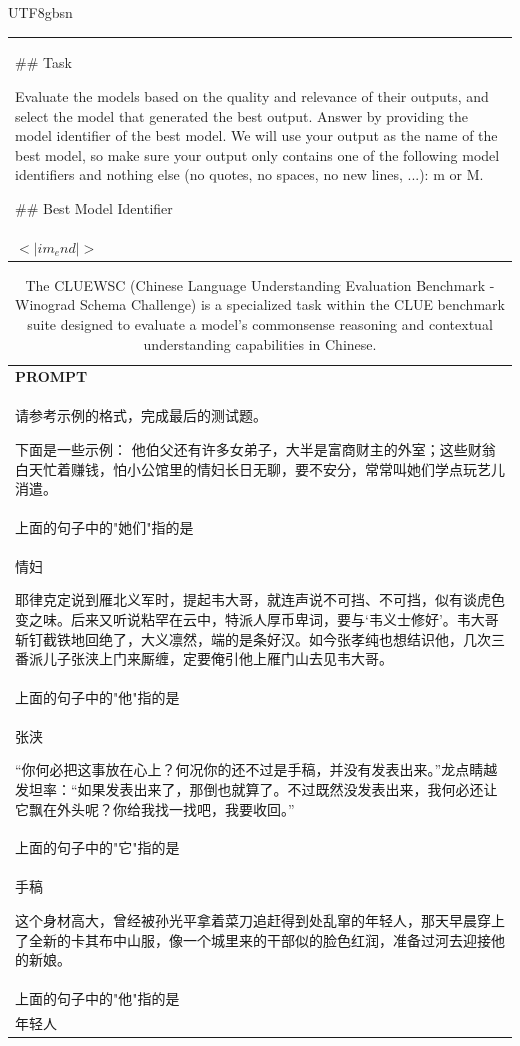 \documentclass[11pt, a4paper, logo, copyright, nonumbering]{deepseek}
\begin{document}
\begin{CJK*}{UTF8}{gbsn}
\begin{table}[h]
\begin{tabular}{p{}}
\#\# Task

Evaluate the models based on the quality and relevance of their outputs, and select the model that generated the best output. Answer by providing the model identifier of the best model. We will use your output as the name of the best model, so make sure your output only contains one of the following model identifiers and nothing else (no quotes, no spaces, no new lines, ...): m or M.

\#\# Best Model Identifier\\
$<|im_end|>$\\ \hline
    \end{tabular}
\end{table}

\begin{table}[h]
    \centering \small
        \caption{The CLUEWSC (Chinese Language Understanding Evaluation Benchmark - Winograd Schema Challenge) is a specialized task within the CLUE benchmark suite designed to evaluate a model's commonsense reasoning and contextual understanding capabilities in Chinese. }
    \label{tab:cluewsc_eval_format_example}
    \begin{tabular}{p{}}
    \hline
    \textbf{PROMPT}\\
    请参考示例的格式，完成最后的测试题。

下面是一些示例：
他伯父还有许多女弟子，大半是富商财主的外室；这些财翁白天忙着赚钱，怕小公馆里的情妇长日无聊，要不安分，常常叫她们学点玩艺儿消遣。\\
上面的句子中的"她们"指的是\\
情妇

耶律克定说到雁北义军时，提起韦大哥，就连声说不可挡、不可挡，似有谈虎色变之味。后来又听说粘罕在云中，特派人厚币卑词，要与‘韦义士修好’。韦大哥斩钉截铁地回绝了，大义凛然，端的是条好汉。如今张孝纯也想结识他，几次三番派儿子张浃上门来厮缠，定要俺引他上雁门山去见韦大哥。\\
上面的句子中的"他"指的是\\
张浃

“你何必把这事放在心上？何况你的还不过是手稿，并没有发表出来。”龙点睛越发坦率：“如果发表出来了，那倒也就算了。不过既然没发表出来，我何必还让它飘在外头呢？你给我找一找吧，我要收回。”\\
上面的句子中的"它"指的是 \\
手稿

这个身材高大，曾经被孙光平拿着菜刀追赶得到处乱窜的年轻人，那天早晨穿上了全新的卡其布中山服，像一个城里来的干部似的脸色红润，准备过河去迎接他的新娘。\\
上面的句子中的"他"指的是 \\
年轻人


\end{tabular}
\end{table}
\end{CJK*}
\end{document}
